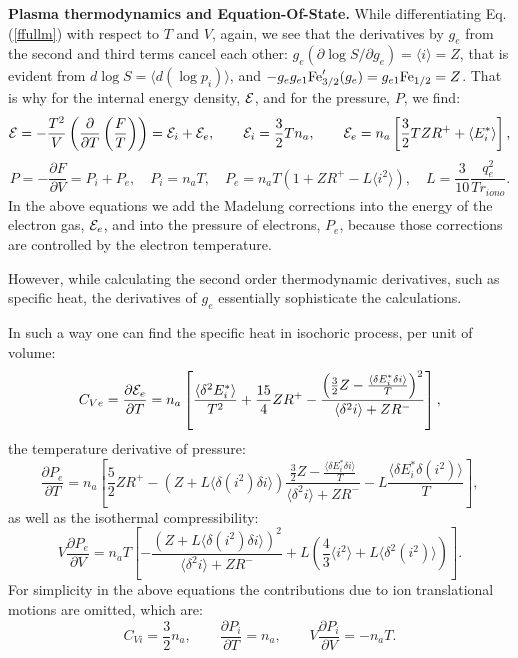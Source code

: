 \documentclass[english,12pt]{revtex4}
\begin{document}
{\bf Plasma thermodynamics and Equation-Of-State.} 
While differentiating Eq.(\ref{ffullm}) with respect to $T$ and $V$, again, we see that the derivatives
by $g_e$ from the second and third terms cancel 
each other: $g_e(\partial \log S/\partial g_e)=\langle i\rangle=Z$,
that is evident from $d \log S = \langle d (\log p_i) \rangle$,
and $-g_eg_{e1}{\rm Fe}^\prime_{3/2}(g_e)=g_{e1}{\rm Fe}_{1/2}=Z$. That is why for the internal energy density, 
${\cal E}$, and for the pressure, $P$, we find:
\begin{equation}
{\cal E} = -\frac{T^2}V\left(\frac{\partial}{\partial T}\left(\frac F T\right)\right)=
{\cal E}_i+{\cal E}_e,\qquad{\cal E}_i=\frac32Tn_a,\qquad
{\cal E}_e = n_a\left[ \frac32 T Z R^+ + \langle E^*_i\rangle \right],
\end{equation}
\begin{equation}
P = -\frac{\partial F}{\partial V}=P_i+P_e,\quad
P_i = n_aT,\quad
P_e = n_aT ( 1 + ZR^+ - L \langle i^2 \rangle ),\quad
L = \frac{3}{10} \frac{q_e^2}{Tr_{iono}}.
\end{equation}
In the above equations we add the Madelung corrections into the energy of the electron gas, ${\cal E}_e$, and
into the pressure of electrons, $P_e$, because those corrections are controlled by the electron temperature.

However, while calculating the second order thermodynamic derivatives,
such as specific heat, the derivatives of $g_e$ essentially sophisticate the 
calculations. 

In such a way one can find the specific heat in isochoric process, per unit of volume:
\begin{equation}
C_{Ve}=\frac{\partial {\cal E}_e}{\partial T}=n_a\left[\frac{\langle\delta^2E^*_i\rangle}{T^2}+\frac{15}4ZR^+
-\frac{\left(\frac32Z-\frac{\langle\delta E^*_i\delta i\rangle}T\right)^2}{\langle\delta^2i\rangle+ZR^-}\right],
\end{equation}
the temperature derivative of pressure:
\begin{equation}
\frac {\partial P_e}{\partial T}=
n_a\left[
	\frac52 Z R^+ -
	(Z+L \langle \delta(i^2) \delta i \rangle)
		\frac{\frac32Z-\frac{\langle\delta E^*_i\delta i\rangle}T}{\langle\delta^2i\rangle+ZR^-} -
	L \frac{\langle \delta E^*_i \delta(i^2) \rangle}T
\right],
\end{equation}
as well as the isothermal compressibility:
\begin{equation}
V\frac{\partial P_e}{\partial V}=
n_a T \left[ -\frac{(Z + L \langle \delta(i^2) \delta i \rangle)^2}{\langle \delta^2 i \rangle + ZR^-} +
L \left( \frac43 \langle i^2 \rangle + L \langle \delta^2(i^2) \rangle \right) \right].
\end{equation}
For simplicity in the above equations the contributions due to ion translational motions are omitted, which are:
\begin{equation}
C_{Vi}=\frac32n_a, \qquad
\frac{\partial P_i}{\partial T}=n_a, \qquad
V\frac{\partial P_i}{\partial V}=-n_aT.
\end{equation}
\end{document}
